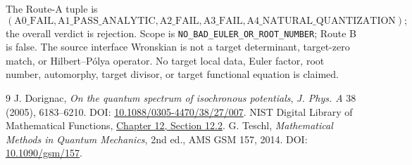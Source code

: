 \documentclass[10pt]{article}
\begin{document}
The Route-A tuple is
\[
(\mathrm{A0\_FAIL},\mathrm{A1\_PASS\_ANALYTIC},\mathrm{A2\_FAIL},
 \mathrm{A3\_FAIL},\mathrm{A4\_NATURAL\_QUANTIZATION});
\]
the overall verdict is rejection. Scope is
\texttt{NO\_BAD\_EULER\_OR\_ROOT\_NUMBER}; Route B is false. The source
interface Wronskian is not a target determinant, target-zero match, or
Hilbert--P\'olya operator. No target local data, Euler factor, root number,
automorphy, target divisor, or target functional equation is claimed.

\begin{thebibliography}{9}
 J. Dorignac, \emph{On the quantum spectrum of isochronous
potentials}, \emph{J. Phys. A} 38 (2005), 6183--6210.
DOI: \href{https://doi.org/10.1088/0305-4470/38/27/007}
{10.1088/0305-4470/38/27/007}.
 NIST Digital Library of Mathematical Functions,
\href{https://dlmf.nist.gov/12.2}{Chapter 12, Section 12.2}.
 G. Teschl, \emph{Mathematical Methods in Quantum Mechanics},
2nd ed., AMS GSM 157, 2014.
DOI: \href{https://doi.org/10.1090/gsm/157}{10.1090/gsm/157}.
\end{thebibliography}
\fi
\end{document}
